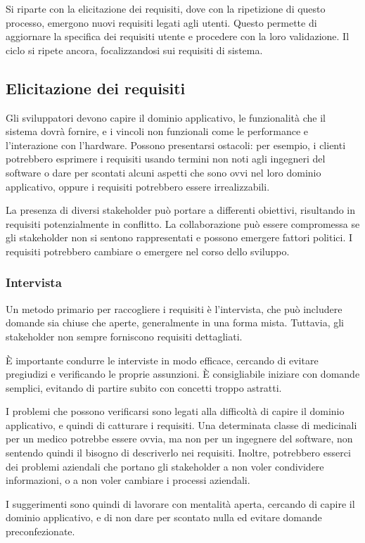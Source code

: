 Si riparte con la elicitazione dei requisiti, dove con la ripetizione di
questo processo, emergono nuovi requisiti legati agli utenti. Questo permette
di aggiornare la specifica dei requisiti utente e procedere con la loro validazione.
Il ciclo si ripete ancora, focalizzandosi sui requisiti di sistema.

\subsection{Elicitazione dei requisiti}
Gli sviluppatori devono capire il dominio applicativo, le funzionalità
che il sistema dovrà fornire, e i vincoli non funzionali come le performance
e l'interazione con l'hardware. Possono presentarsi ostacoli: per esempio, i
clienti potrebbero esprimere i requisiti usando termini non noti agli ingegneri
del software o dare per scontati alcuni aspetti che sono ovvi nel loro dominio
applicativo, oppure i requisiti potrebbero essere irrealizzabili.

La presenza di diversi stakeholder può portare a differenti obiettivi, risultando
in requisiti potenzialmente in conflitto. La collaborazione può essere compromessa
se gli stakeholder non si sentono rappresentati e possono emergere fattori politici.
I requisiti potrebbero cambiare o emergere nel corso dello sviluppo.
\subsubsection{Intervista}
Un metodo primario per raccogliere i requisiti è l'intervista, che può includere
domande sia chiuse che aperte, generalmente in una forma mista. Tuttavia, gli
stakeholder non sempre forniscono requisiti dettagliati.

È importante condurre
le interviste in modo efficace, cercando di evitare pregiudizi e verificando le
proprie assunzioni. È consigliabile iniziare con domande semplici, evitando di
partire subito con concetti troppo astratti.

I problemi che possono verificarsi sono legati alla difficoltà di capire
il dominio applicativo, e quindi di catturare i requisiti. Una determinata classe 
di medicinali per un medico potrebbe essere ovvia, ma non per un ingegnere del software,
non sentendo quindi il bisogno di descriverlo nei requisiti. Inoltre, potrebbero
esserci dei problemi aziendali che portano gli stakeholder a non voler
condividere informazioni, o a non voler cambiare i processi aziendali.

I suggerimenti sono quindi di lavorare con mentalità aperta, cercando di
capire il dominio applicativo, e di non dare per scontato nulla ed evitare 
domande preconfezionate. 
